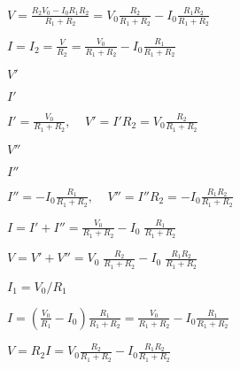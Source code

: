 \documentclass{article}
\def\lthtmlcheckvsize{\ifdim\ht\sizebox<\vsize 
  \ifdim\wd\sizebox<\hsize\expandafter\hfill\fi \expandafter\vfill
  \else\expandafter\vss\fi}%
\begin{document}
{\newpage\clearpage
{}%
$\displaystyle V=\frac{R_2V_0-I_0R_1R_2}{R_1+R_2}
=V_0\frac{R_2}{R_1+R_2}-I_0\frac{R_1R_2}{R_1+R_2}$%
\lthtmlindisplaymathZ
\lthtmlcheckvsize\clearpage}

{\newpage\clearpage
{}%
$\displaystyle I=I_2=\frac{V}{R_2}=\frac{V_0}{R_1+R_2}-I_0\frac{R_1}{R_1+R_2}$%
\lthtmlindisplaymathZ
\lthtmlcheckvsize\clearpage}

{\newpage\clearpage
{}%
$ V'$%
\lthtmlindisplaymathZ
\lthtmlcheckvsize\clearpage}

{\newpage\clearpage
{}%
$ I'$%
\lthtmlindisplaymathZ
\lthtmlcheckvsize\clearpage}

{\newpage\clearpage
{}%
$\displaystyle I'=\frac{V_0}{R_1+R_2},\;\;\;\;V'=I'R_2=V_0\frac{R_2}{R_1+R_2}$%
\lthtmlindisplaymathZ
\lthtmlcheckvsize\clearpage}

{\newpage\clearpage
{}%
$ V''$%
\lthtmlindisplaymathZ
\lthtmlcheckvsize\clearpage}

{\newpage\clearpage
{}%
$ I''$%
\lthtmlindisplaymathZ
\lthtmlcheckvsize\clearpage}

{\newpage\clearpage
{}%
$\displaystyle I''=-I_0\frac{R_1}{R_1+R_2},\;\;\;\;V''=I''R_2=-I_0\frac{R_1R_2}{R_1+R_2}$%
\lthtmlindisplaymathZ
\lthtmlcheckvsize\clearpage}

{\newpage\clearpage
{}%
$\displaystyle I=I'+I''=\frac{V_0}{R_1+R_2}-I_0\;\frac{R_1}{R_1+R_2}$%
\lthtmlindisplaymathZ
\lthtmlcheckvsize\clearpage}

{\newpage\clearpage
{}%
$\displaystyle V=V'+V''=V_0\;\frac{R_2}{R_1+R_2}-I_0\;\frac{R_1R_2}{R_1+R_2}$%
\lthtmlindisplaymathZ
\lthtmlcheckvsize\clearpage}

{\newpage\clearpage
{}%
$ I_1=V_0/R_1$%
\lthtmlindisplaymathZ
\lthtmlcheckvsize\clearpage}

{\newpage\clearpage
{}%
$\displaystyle I=\left(\frac{V_0}{R_1}-I_0\right)\frac{R_1}{R_1+R_2}
=\frac{V_0}{R_1+R_2}-I_0\frac{R_1}{R_1+R_2}$%
\lthtmlindisplaymathZ
\lthtmlcheckvsize\clearpage}

{\newpage\clearpage
{}%
$\displaystyle V=R_2I=V_0\frac{R_2}{R_1+R_2}-I_0\frac{R_1R_2}{R_1+R_2}$%
\lthtmlindisplaymathZ
\lthtmlcheckvsize\clearpage}
\end{document}
